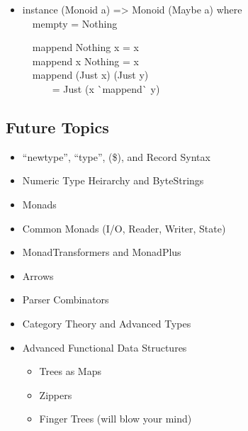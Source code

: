 \documentclass{beamer}                  %
\newcommand{\srule}{
	\rule{\textwidth}{1pt}\\
}
\newlength{\subsecwidth}
\newenvironment{slide}{
	\begin{frame} %
	\settowidth{\subsecwidth}{\insertsubsection} %
	\ifthenelse{\dimtest{\subsecwidth}{<}{1pt}}{ %
		\frametitle{\insertsection\\             %
		\vspace{-1ex}                            %
		\color{fore}\srule                       %
		\par                                     %
		\vspace{-3ex}                            %
		}
	}{                                           %
		\frametitle{\insertsection\ -- \insertsubsection\\ %
		\vspace{-1ex}                            %
		\color{fore}\srule                       %
		\par                                     %
		\vspace{-3ex}                            %
		}
	}
	\Large                                       %
}{
	\end{frame}
}
\begin{document}
\begin{slide}
  \begin{itemize}
    \item
      instance (Monoid a) => Monoid (Maybe a) where\\
      ~~mempty = Nothing

      ~~mappend Nothing x = x\\
      ~~mappend x Nothing = x\\
      ~~mappend (Just x) (Just y)\\
      ~~~~~~= Just (x \`{}mappend\`{} y)
  \end{itemize}
\end{slide}

\subsection{Future Topics}

\begin{slide}
  \begin{itemize}
    \item ``newtype'', ``type'', (\$), and Record Syntax
    \item Numeric Type Heirarchy and ByteStrings
    \item Monads
    \item Common Monads (I/O, Reader, Writer, State)
    \item MonadTransformers and MonadPlus
    \item Arrows
    \item Parser Combinators
    \item Category Theory and Advanced Types
    \item Advanced Functional Data Structures
      \begin{itemize}
        \item Trees as Maps
        \item Zippers
        \item Finger Trees (will blow your mind)
      \end{itemize}
  \end{itemize}
\end{slide}
\end{document}
